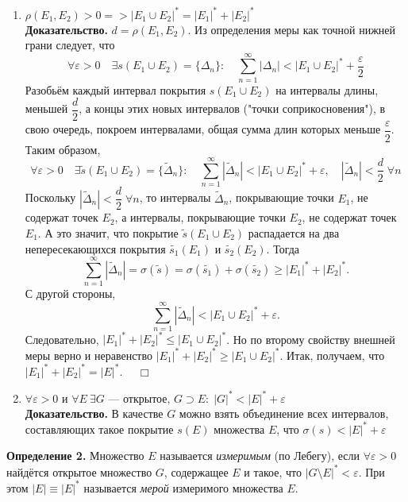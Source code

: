 \documentclass[12pt,a4paper, titlepage]{article}
\begin{document}
\begin{enumerate}
\item $\rho(E_1, E_2) > 0 => |E_1 \cup E_2|^* = |E_1|^* + |E_2|^*$\smallskip\\
\textbf{Доказательство.}
$d = \rho(E_1, E_2)$.
Из определения меры как точной нижней грани следует, что
$$
\forall \varepsilon > 0 \quad \exists s(E_1 \cup E_2) = \lbrace \Delta_n \rbrace :
\quad \sum^\infty_{n=1} |\Delta_n| < |E_1 \cup E_2|^* + \frac{\varepsilon}{2}
$$
Разобьём каждый интервал покрытия $s(E_1 \cup E_2)$ на интервалы длины, меньшей $\dfrac{d}{2}$, а концы этих новых интервалов ("точки соприкосновения"), в свою очередь, покроем интервалами, общая сумма длин которых меньше $\dfrac{\varepsilon}{2}$. Таким образом,
$$
\forall \varepsilon > 0 \quad \exists \widetilde{s}(E_1 \cup E_2) = \lbrace \widetilde{\Delta}_n \rbrace :
\quad \sum^\infty_{n=1} |\widetilde{\Delta}_n| < |E_1 \cup E_2|^* + \varepsilon, \quad |\widetilde{\Delta}_n| < \frac{d}{2} \; \forall n
$$
Поскольку $|\widetilde{\Delta}_n| < \dfrac{d}{2} \; \forall n$, то интервалы $\widetilde{\Delta}_n$, покрывающие точки $E_1$, не содержат точек $E_2$, а интервалы, покрывающие точки $E_2$, не содержат точек $E_1$. А это значит, что покрытие $\widetilde{s}(E_1 \cup E_2)$ распадается на два непересекающихся покрытия $\widetilde{s_1}(E_1)$ и $\widetilde{s_2}(E_2)$. Тогда
$$
\sum^\infty_{n=1} |\widetilde{\Delta}_n| = \sigma(\tilde{s}) = \sigma(\tilde{s_1}) + \sigma(\tilde{s_2}) 
\geqslant |E_1|^* + |E_2|^*.
$$
С другой стороны,
$$
\sum^\infty_{n=1} |\widetilde{\Delta}_n| < |E_1 \cup E_2|^* + \varepsilon.
$$
Следовательно, $|E_1|^* + |E_2|^* \leqslant |E_1 \cup E_2|^*$. Но по второму свойству внешней меры верно и неравенство $|E_1|^* + |E_2|^* \geqslant |E_1 \cup E_2|^*.$ Итак, получаем, что  $|E_1|^* + |E_2|^* = |E|^*$. $\quad \Box$\\
\item $\forall \varepsilon > 0 \mbox{ и } \forall E \ \exists G \text{ --- открытое, } G \supset E: \; |G|^* < |E|^* + \varepsilon$\smallskip\\
\textbf{Доказательство.}
В качестве $G$ можно взять объединение всех интервалов, составляющих такое покрытие $s(E)$ множества $E$, что $\sigma(s) < |E|^* + \varepsilon$
\end{enumerate}


\textbf{Определение 2.} Множество $E$ называется \textit{измеримым} (по Лебегу), если $\forall \varepsilon > 0$ найдётся открытое множество $G$, содержащее $E$ и такое, что $|G \setminus E|^* < \varepsilon$. При этом $|E| \equiv |E|^*$ называется \textit{мерой} измеримого множества $E$.\\
\end{document}
